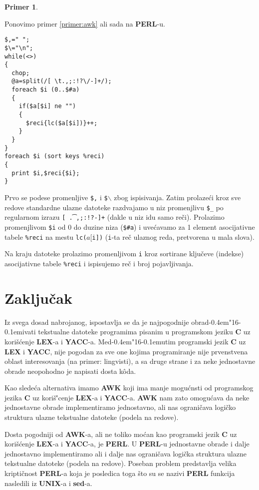 \documentclass[12pt,a4paper]{article}
\def\d{d\kern-0.4em\char"16\kern-0.1em}
\def\bs{$\backslash$}
\newtheorem{primer}{Primer}[section]
\begin{document}
        \begin{primer}\ \end{primer}
        Ponovimo primer \ref{primer:awk} ali sada na {\bf PERL}-u.
        \begin{verbatim}
$,=" ";
$\="\n";
while(<>)
{
  chop;
  @a=split(/[ \t.,;:!?\/-]+/);
  foreach $i (0..$#a)
  {
    if($a[$i] ne "")
    {
      $reci{lc($a[$i])}++;
    }
  }
}
foreach $i (sort keys %reci)
{
  print $i,$reci{$i};
}
\end{verbatim}

        Prvo se podese promenljive {\tt\$,} i {\tt\$\bs} zbog ispisivanja.
        Zatim prolaze\'ci kroz sve redove standardne ulazne datoteke
        razdvajamo u niz {\tt@a} promenjlivu {\tt\$\_} po regularnom izrazu
        {\tt[ \t.,;:!?\/-]+} (dakle u niz {\tt@a} idu samo re\v ci).
        Prolazimo promenjlivom {\tt\$i} od 0 do duzine niza {\tt@a}
        ({\tt\$\#a}) i uve\'cavamo za 1 element asocijativne tabele
        {\tt\%reci} na mestu {\tt lc($a[$i])} ({\tt i}-ta re\v c ulaznog reda,
        pretvorena u mala slova).

        Na kraju datoteke prolazimo promenljivom {\tt i} kroz sortirane
        klju\v ceve (indekse) asocijativne tabele {\tt\%reci} i ispisujemo
        re\v c i broj pojavljivanja.
%
%
  \newpage
  \section{Zaklju\v cak}
    Iz svega dosad nabrojanog, ispostavlja se da je najpogodnije obra\d ivati
    te\-kstualne datoteke programima pisanim u programskom jeziku {\bf C} uz
    kori\v s\'cenje {\bf LEX}-a i {\bf YACC}-a.
    Me\d utim programski jezik {\bf C} uz {\bf LEX} i {\bf YACC}, nije
    pogodan za sve one kojima programiranje nije prvenstvena oblast
    interesovanja (na primer: lingvisti), a sa druge strane i za neke
    jednostavne obrade neopohodno je napisati dosta k\^oda.

    Kao slede\'ca alternativa imamo {\bf AWK} koji ima manje mogu\'cnsti od
    programskog jezika {\bf C} uz kori\v s\''cenje {\bf LEX}-a i
    {\bf YACC}-a.
    {\bf AWK} nam zato omogu\'cava da neke jednostavne obrade implementiramo
    jednostavno, ali nas ograni\v cava logi\v cko struktura ulazne tekstualne
    datoteke (podela na redove).

    Dosta pogodniji od {\bf AWK}-a, ali ne toliko mo\'can kao programski
    jezik {\bf C} uz kori\v s\'cenje {\bf LEX}-a i {\bf YACC}-a, je
    {\bf PERL}.
    U {\bf PERL}-u jednostavne obrade i dalje jednostavno implementiramo ali
    i dalje nas ograni\v cava logi\v cka struktura ulazne tekstualne
    datoteke (podela na redove).
    Poseban problem predstavlja velika kripti\v cnost {\bf PERL}-a koja je
    posledica toga \v sto su se nazivi {\bf PERL} funkcija nasledili iz
    {\bf UNIX}-a i {\bf sed}-a.
\end{document}
